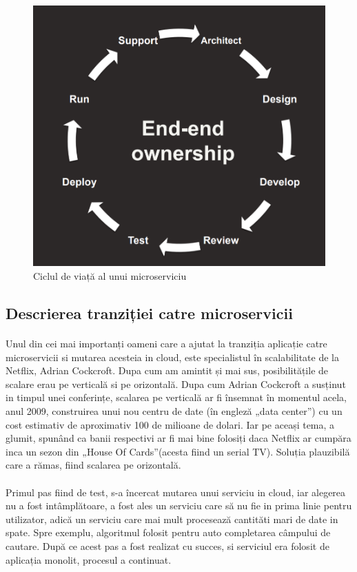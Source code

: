 \documentclass[12pt]{report}
\begin{document}
  	\begin{figure}[h]
  	\centering
  	\includegraphics[scale=.7]{endtoend}
	\caption{Ciclul de viață al unui microserviciu \cite{ruslan}}  
	\label{endtoend}
  	\end{figure}
  	\subsection{Descrierea tranziției catre microservicii}
  	\paragraph{}Unul din cei mai importanți oameni care a ajutat la tranziția aplicație catre microservicii si mutarea acesteia in cloud, este specialistul în scalabilitate de la Netflix, Adrian Cockcroft. Dupa cum am amintit și mai sus, posibilitățile de scalare erau pe verticală si pe orizontală. Dupa cum Adrian Cockcroft a susținut in timpul unei conferințe, scalarea pe verticală ar fi însemnat în momentul acela, anul 2009, construirea unui nou centru de date (în engleză „data center”) cu un cost estimativ de aproximativ 100 de milioane de dolari. Iar pe aceași tema, a glumit, spunând ca banii respectivi ar fi mai bine folosiți daca Netflix ar cumpăra inca un sezon din „House Of Cards”(acesta fiind un serial TV). Soluția plauzibilă care a rămas, fiind scalarea pe orizontală. \cite{harris1}
  	\paragraph{}Primul pas fiind de test, s-a încercat mutarea unui serviciu in cloud, iar alegerea nu a fost intâmplătoare, a fost ales un serviciu care să nu fie in prima linie pentru utilizator, adică un serviciu care mai mult procesează cantităti mari de date in spate. Spre exemplu, algoritmul folosit pentru auto completarea câmpului de cautare. După ce acest pas a fost realizat cu succes, si serviciul era folosit de aplicația monolit, procesul a continuat.
\end{document}
